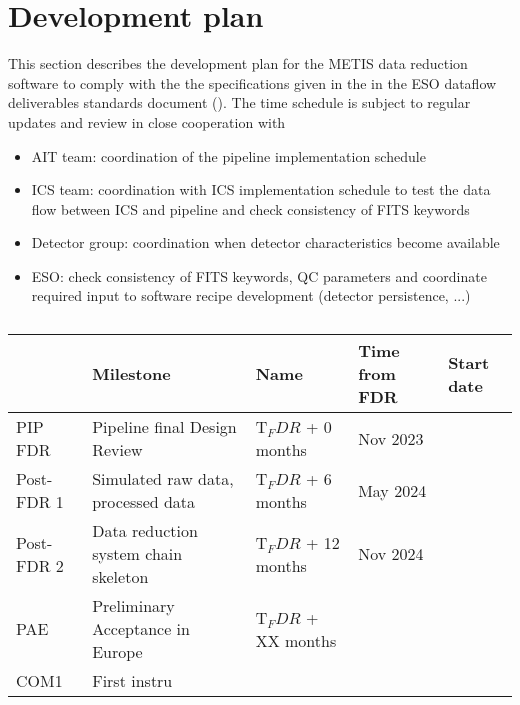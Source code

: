 \clearpage
\section{Development plan}\label{sec:development_plan}

This section describes the development plan for the METIS data reduction software to comply with the the specifications given in the in the ESO dataflow deliverables standards document (\cite{1618}). The time schedule is subject to regular updates and review in close cooperation with

\begin{itemize}
    \item AIT team: coordination of the pipeline implementation schedule
    \item ICS team: coordination with ICS implementation schedule to test the data flow between ICS and pipeline and check consistency of FITS keywords
    \item Detector group: coordination when detector characteristics become available
    \item ESO: check consistency of FITS keywords, QC parameters and coordinate required input to software recipe development (detector persistence, ...)
\end{itemize}

\begin{table}
    \caption[Milestones of the METIS pipeline software development schedule starting at FDR]{}
  \label{tab:calibrations_per_mode}
  \centering\scriptsize
  \begin{tabularx}{\textwidth}{llll}
    \hline
                           & Milestone & Name & Time from FDR & Start date \\
    \hline\hline
    PIP FDR          & Pipeline final Design Review & T$_FDR$ + 0 months & Nov 2023 \\
    Post-FDR 1       & Simulated raw data, processed data &  T$_FDR$ + 6 months & May 2024 \\
    Post-FDR 2       & Data reduction system chain skeleton &  T$_FDR$ + 12 months & Nov 2024 \\
    PAE              & Preliminary Acceptance in Europe &  T$_FDR$ + XX months &  \\
    COM1             & First instru

    \hline
  \end{tabularx}
\end{table}